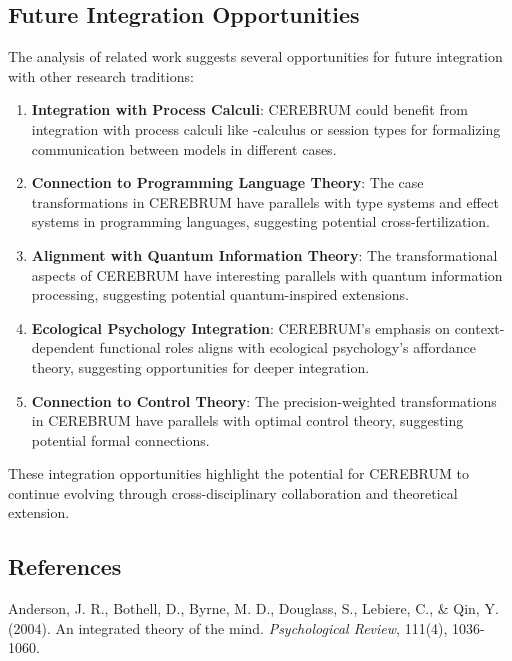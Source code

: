 \documentclass[
  11pt,
  letterpaper,
]{article}
\begin{document}
\hypertarget{future-integration-opportunities}{%
\subsection{Future Integration
Opportunities}\label{future-integration-opportunities}}

The analysis of related work suggests several opportunities for future
integration with other research traditions:

\begin{enumerate}
\def\labelenumi{\arabic{enumi}.}
\item
  \textbf{Integration with Process Calculi}: CEREBRUM could benefit from
  integration with process calculi like -calculus or session types for
  formalizing communication between models in different cases.
\item
  \textbf{Connection to Programming Language Theory}: The case
  transformations in CEREBRUM have parallels with type systems and
  effect systems in programming languages, suggesting potential
  cross-fertilization.
\item
  \textbf{Alignment with Quantum Information Theory}: The
  transformational aspects of CEREBRUM have interesting parallels with
  quantum information processing, suggesting potential quantum-inspired
  extensions.
\item
  \textbf{Ecological Psychology Integration}: CEREBRUM's emphasis on
  context-dependent functional roles aligns with ecological psychology's
  affordance theory, suggesting opportunities for deeper integration.
\item
  \textbf{Connection to Control Theory}: The precision-weighted
  transformations in CEREBRUM have parallels with optimal control
  theory, suggesting potential formal connections.
\end{enumerate}

These integration opportunities highlight the potential for CEREBRUM to
continue evolving through cross-disciplinary collaboration and
theoretical extension.

\hypertarget{references}{%
\subsection{References}\label{references}}

Anderson, J. R., Bothell, D., Byrne, M. D., Douglass, S., Lebiere, C.,
\& Qin, Y. (2004). An integrated theory of the mind. \emph{Psychological
Review}, 111(4), 1036-1060.
\end{document}
